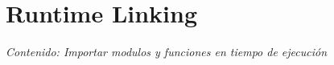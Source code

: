 \section{Runtime Linking}

\textit{Contenido: Importar modulos y funciones en tiempo de ejecución}
\vspace{1em}

